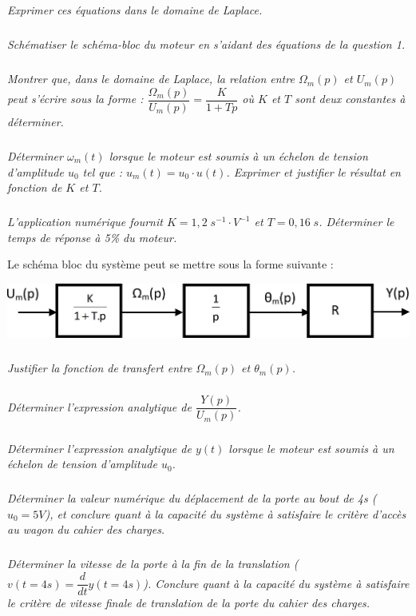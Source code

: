 \documentclass[10pt,fleqn]{article} %
\begin{document}
\begin{multicols}{2}
\subparagraph{}
\textit{Exprimer ces équations dans le domaine de Laplace.}

\subparagraph{}
\textit{Schématiser le schéma-bloc du moteur en s’aidant des équations de la question 1.}

\subparagraph{}
\textit{Montrer que, dans le domaine de Laplace, la relation entre $\Omega_m (p)$ et $U_m (p)$ peut s'écrire sous la forme : $\dfrac{\Omega_m(p)}{U_m(p)} = \dfrac{K}{1+Tp} $ où $K$ et $T$ sont deux constantes à déterminer.}

\subparagraph{}
\textit{Déterminer $\omega_m (t)$ lorsque le moteur est soumis à un échelon de tension d'amplitude $u_0$ tel que : $u_m (t)= u_0 \cdot u(t)$. Exprimer et justifier le résultat en fonction de $K$ et $T$.}

\subparagraph{}
\textit{L'application numérique fournit $K=1,2 \; s^{-1}\cdot V^{-1}$ et $T=0,16\;s$. Déterminer le temps de réponse à 5\% du moteur.}

 Le schéma bloc du système peut se mettre sous la forme suivante :

 \begin{center}
\includegraphics[width=\linewidth]{images/fig_04}
\end{center} 

\subparagraph{}
\textit{Justifier la fonction de transfert entre $\Omega_m(p)$ et $\theta_m (p)$.}  

\subparagraph{}
\textit{Déterminer l'expression analytique de $\dfrac{Y(p)}{U_m(p)}$.}

\subparagraph{}
\textit{Déterminer l'expression analytique de $y(t)$ lorsque le moteur est soumis à un échelon de tension d'amplitude $u_0$.}  

\subparagraph{}
\textit{Déterminer la valeur numérique du déplacement de la porte au bout de 4s ($u_0 =5V$), et conclure quant à la capacité du système à satisfaire le critère d'accès au wagon du cahier des charges.}

\subparagraph{}
\textit{Déterminer la vitesse de la porte à la fin de la translation ($v(t=4s)= \dfrac{d}{dt}y(t=4s)$). Conclure quant à la capacité du système à satisfaire le critère de vitesse finale de translation de la porte du cahier des charges. }
\end{multicols}
\end{document}
